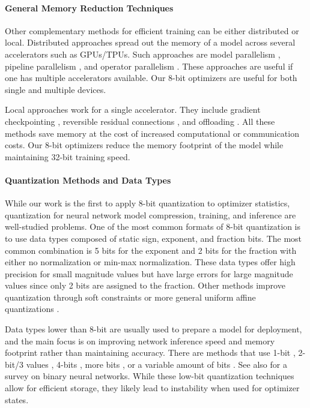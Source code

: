 \paragraph{General Memory Reduction Techniques} Other complementary methods for efficient training can be either distributed or local. Distributed approaches spread out the memory of a model across several accelerators such as GPUs/TPUs. Such approaches are model parallelism \citep{krizhevsky2009learning}, pipeline parallelism \citep{krizhevsky2009learning,huang2018gpipe,harlap2018pipedream}, and operator parallelism \citep{lepikhin2020gshard}. These approaches are useful if one has multiple accelerators available. Our 8-bit optimizers are useful for both single and multiple devices.

Local approaches work for a single accelerator. They include gradient checkpointing \citep{chen2016training}, reversible residual connections \citep{gomez2017reversible}, and offloading \citep{pudipeddi2020training,rajbhandari2021zero}. All these methods save memory at the cost of increased computational or communication costs. Our 8-bit optimizers reduce the memory footprint of the model while maintaining 32-bit training speed.

\paragraph{Quantization Methods and Data Types}

While our work is the first to apply 8-bit quantization to optimizer statistics, quantization for neural network model compression, training, and inference are well-studied problems. One of the most common formats of 8-bit quantization is to use data types composed of static sign, exponent, and fraction bits. The most common combination is 5 bits for the exponent and 2 bits for the fraction \citep{wang2018training8bit,sun2019hybrid8bit,cambier2020shiftsqueeze,mellempudi2019bit8} with either no normalization or min-max normalization. These data types offer high precision for small magnitude values but have large errors for large magnitude values since only 2 bits are assigned to the fraction. Other methods improve quantization through soft constraints \citep{li2021endtoend} or more general uniform affine quantizations \citep{brevitas}.

Data types lower than 8-bit are usually used to prepare a model for deployment, and the main focus is on improving network inference speed and memory footprint rather than maintaining accuracy. There are methods that use 1-bit \citep{courbariaux2016bit1,Rastegari2016xnor,courbariaux2015binaryconnect}, 2-bit/3 values \citep{zhu2017ternary,choi2019bit2}, 4-bits \citep{li2019bit4}, more bits \citep{courbariaux2014training}, or a variable amount of bits \citep{gong2019softquant}. See also \cite{qin2020survey1bit} for a survey on binary neural networks. While these low-bit quantization techniques allow for efficient storage, they likely lead to instability when used for optimizer states.


